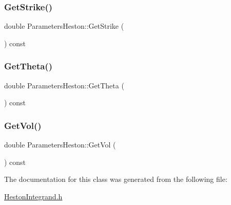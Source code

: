 \subsubsection{\texorpdfstring{Get\+Strike()}{GetStrike()}}
{\footnotesize\ttfamily double Parameters\+Heston\+::\+Get\+Strike (\begin{DoxyParamCaption}{ }\end{DoxyParamCaption}) const\hspace{0.3cm}{\ttfamily [inline]}}

\hypertarget{classParametersHeston_a29677f9499c18a64d0c583fa28abced6}{}\label{classParametersHeston_a29677f9499c18a64d0c583fa28abced6} 
\subsubsection{\texorpdfstring{Get\+Theta()}{GetTheta()}}
{\footnotesize\ttfamily double Parameters\+Heston\+::\+Get\+Theta (\begin{DoxyParamCaption}{ }\end{DoxyParamCaption}) const\hspace{0.3cm}{\ttfamily [inline]}}

\hypertarget{classParametersHeston_a5b59a5d1acaeb5af6ac7135d5ddfbe9a}{}\label{classParametersHeston_a5b59a5d1acaeb5af6ac7135d5ddfbe9a} 
\subsubsection{\texorpdfstring{Get\+Vol()}{GetVol()}}
{\footnotesize\ttfamily double Parameters\+Heston\+::\+Get\+Vol (\begin{DoxyParamCaption}{ }\end{DoxyParamCaption}) const\hspace{0.3cm}{\ttfamily [inline]}}



The documentation for this class was generated from the following file\+:\begin{DoxyCompactItemize}
\item 
\hyperlink{HestonIntegrand_8h}{Heston\+Integrand.\+h}\end{DoxyCompactItemize}
